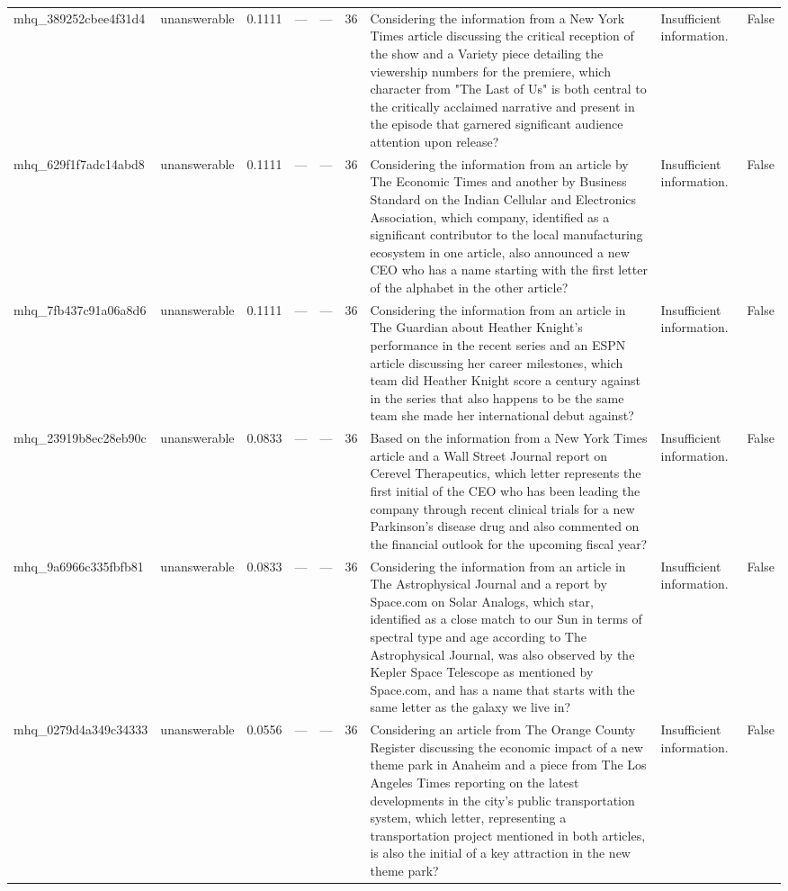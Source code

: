 \begin{tabular}{llrrrrllr}
mhq_389252cbee4f31d4 & unanswerable & 0.1111 & — & — & 36 & Considering the information from a New York Times article discussing the critical reception of the show and a Variety piece detailing the viewership numbers for the premiere, which character from "The Last of Us" is both central to the critically acclaimed narrative and present in the episode that garnered significant audience attention upon release? & Insufficient information. & False \\
mhq_629f1f7adc14abd8 & unanswerable & 0.1111 & — & — & 36 & Considering the information from an article by The Economic Times and another by Business Standard on the Indian Cellular and Electronics Association, which company, identified as a significant contributor to the local manufacturing ecosystem in one article, also announced a new CEO who has a name starting with the first letter of the alphabet in the other article? & Insufficient information. & False \\
mhq_7fb437c91a06a8d6 & unanswerable & 0.1111 & — & — & 36 & Considering the information from an article in The Guardian about Heather Knight's performance in the recent series and an ESPN article discussing her career milestones, which team did Heather Knight score a century against in the series that also happens to be the same team she made her international debut against? & Insufficient information. & False \\
mhq_23919b8ec28eb90c & unanswerable & 0.0833 & — & — & 36 & Based on the information from a New York Times article and a Wall Street Journal report on Cerevel Therapeutics, which letter represents the first initial of the CEO who has been leading the company through recent clinical trials for a new Parkinson's disease drug and also commented on the financial outlook for the upcoming fiscal year? & Insufficient information. & False \\
mhq_9a6966c335fbfb81 & unanswerable & 0.0833 & — & — & 36 & Considering the information from an article in The Astrophysical Journal and a report by Space.com on Solar Analogs, which star, identified as a close match to our Sun in terms of spectral type and age according to The Astrophysical Journal, was also observed by the Kepler Space Telescope as mentioned by Space.com, and has a name that starts with the same letter as the galaxy we live in? & Insufficient information. & False \\
mhq_0279d4a349c34333 & unanswerable & 0.0556 & — & — & 36 & Considering an article from The Orange County Register discussing the economic impact of a new theme park in Anaheim and a piece from The Los Angeles Times reporting on the latest developments in the city's public transportation system, which letter, representing a transportation project mentioned in both articles, is also the initial of a key attraction in the new theme park? & Insufficient information. & False \\

\end{tabular}
